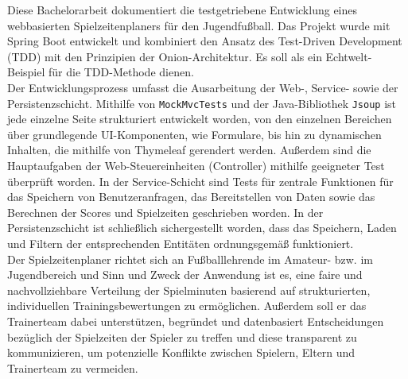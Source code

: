 
Diese Bachelorarbeit dokumentiert die testgetriebene Entwicklung eines webbasierten 
Spielzeitenplaners für den Jugendfußball. Das Projekt wurde mit Spring Boot entwickelt und 
kombiniert den Ansatz des Test-Driven Development (TDD) mit den Prinzipien der 
Onion-Architektur. Es soll als ein Echtwelt-Beispiel für die TDD-Methode dienen. \\ 
Der Entwicklungsprozess umfasst die Ausarbeitung der Web-, Service- sowie der 
Persistenzschicht. 
Mithilfe von \texttt{MockMvcTests} und der Java-Bibliothek \texttt{Jsoup} ist jede einzelne 
Seite strukturiert entwickelt worden, von den einzelnen Bereichen über grundlegende 
UI-Komponenten, wie Formulare, bis hin zu dynamischen Inhalten, die mithilfe von Thymeleaf 
gerendert werden. Außerdem sind die Hauptaufgaben der Web-Steuereinheiten (Controller) 
mithilfe geeigneter Test überprüft worden. In der Service-Schicht sind Tests für zentrale 
Funktionen für das Speichern von Benutzeranfragen, das Bereitstellen von Daten sowie das 
Berechnen der Scores und Spielzeiten geschrieben worden. In der Persistenzschicht ist 
schließlich sichergestellt worden, dass das Speichern, Laden und Filtern der entsprechenden 
Entitäten ordnungsgemäß funktioniert. \\ 
Der Spielzeitenplaner richtet sich an Fußballlehrende im Amateur- bzw. im Jugendbereich 
und Sinn und Zweck der Anwendung ist es, eine faire und nachvollziehbare Verteilung 
der Spielminuten basierend auf strukturierten, individuellen Trainingsbewertungen zu 
ermöglichen. Außerdem soll er das Trainerteam dabei unterstützen, begründet und datenbasiert 
Entscheidungen bezüglich der Spielzeiten der Spieler zu treffen und diese transparent zu 
kommunizieren, um potenzielle Konflikte zwischen Spielern, Eltern und Trainerteam zu 
vermeiden. 

